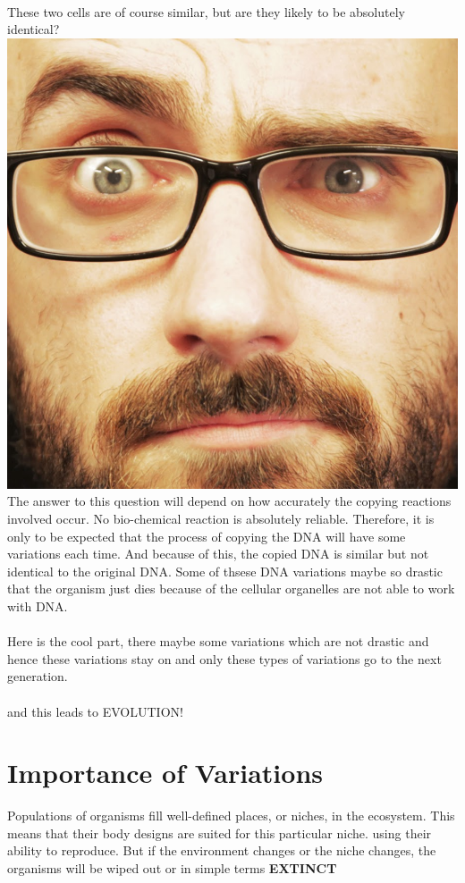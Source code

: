 \documentclass[A4]{article}
\newcommand{\vsauce}{\includegraphics[scale=0.015]{vsauce-eyes.jpg}}
\begin{document}
    \paragraph{}
    These two cells are of course similar, but are they likely to be absolutely identical? \vsauce
    The answer to this question will depend on how accurately the copying reactions involved occur. 
    No bio-chemical reaction is absolutely reliable. 
    Therefore, it is only to be expected that the process of copying the DNA will have some variations each time.
    And because of this, the copied DNA is similar but not identical to the original DNA.
    Some of thsese DNA variations maybe so drastic that the organism just dies because of the cellular organelles are not able to work with DNA. 
    \paragraph{}
    Here is the cool part, there maybe some variations which are not drastic and hence these variations stay on and only these types of variations go to the next generation.\\ 
    \paragraph{}
    \Huge{and this leads to EVOLUTION!}
    \section{Importance of Variations}
    Populations of organisms fill well-defined places, or niches, in the ecosystem. 
    This means that their body designs are suited for this particular niche. 
    using their ability to reproduce.
    But if the environment changes or the niche changes, the organisms will be wiped out or in simple terms \textbf{EXTINCT}
\end{document}
